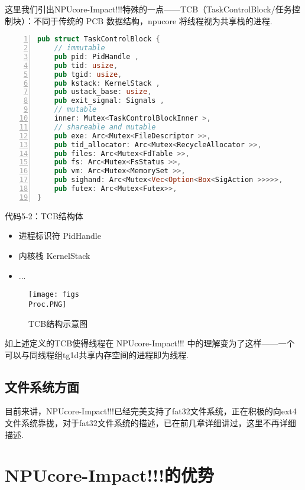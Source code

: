 \documentclass{article}
\begin{document}
这里我们引出NPUcore-Impact!!!特殊的一点——TCB（TaskControlBlock/任务控制块）：不同于传统的 PCB 数据结构，npucore
将线程视为共享栈的进程.

\begin{center}
\begin{lstlisting}[language=RUST,numbers=left]
pub struct TaskControlBlock {
    // immutable
    pub pid: PidHandle ,
    pub tid: usize,
    pub tgid: usize,
    pub kstack: KernelStack ,
    pub ustack_base: usize,
    pub exit_signal: Signals ,
    // mutable
    inner: Mutex<TaskControlBlockInner >,
    // shareable and mutable
    pub exe: Arc<Mutex<FileDescriptor >>,
    pub tid_allocator: Arc<Mutex<RecycleAllocator >>,
    pub files: Arc<Mutex<FdTable >>,
    pub fs: Arc<Mutex<FsStatus >>,
    pub vm: Arc<Mutex<MemorySet >>,
    pub sighand: Arc<Mutex<Vec<Option<Box<SigAction >>>>>,
    pub futex: Arc<Mutex<Futex>>,
}
\end{lstlisting}
代码5-2：TCB结构体
\end{center}

\begin{center}
    \begin{itemize}
        \item 进程标识符 PidHandle
        \item 内核栈 KernelStack
        \item ...
    \end{itemize}
\end{center}

\newpage

\begin{figure}[h]
    \centering
    \texttt{[image: figs\\Proc.PNG]}
    \caption{TCB结构示意图}
    \label{TCB结构示意图}
\end{figure}

如上述定义的TCB使得线程在 NPUcore-Impact!!! 中的理解变为了这样——一个可以与同线程组tg1d共享内存空间的进程即为线程.

\subsection{文件系统方面}

目前来讲，NPUcore-Impact!!!已经完美支持了fat32文件系统，正在积极的向ext4文件系统靠拢，对于fat32文件系统的描述，已在前几章详细讲过，这里不再详细描述.

\section{NPUcore-Impact!!!的优势}
\end{document}
